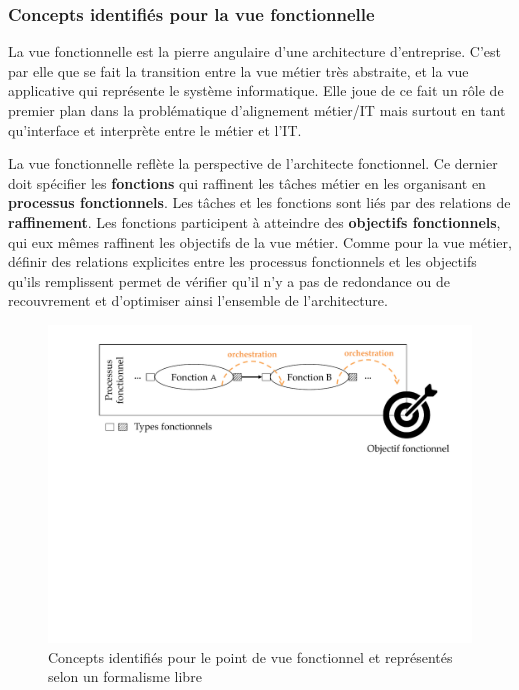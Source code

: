     \subsubsection{Concepts identifiés pour la vue fonctionnelle}

    La vue fonctionnelle est la pierre angulaire d'une architecture d'entreprise. C'est par elle que se fait la transition entre la vue métier très abstraite, et la vue applicative qui représente le système informatique.
    Elle joue de ce fait un rôle de premier plan dans la problématique d'alignement métier/IT mais surtout en tant
    qu'interface et interprète entre le métier et l'IT.

    La vue fonctionnelle reflète la perspective de l'architecte fonctionnel. Ce dernier doit spécifier les \textbf{fonctions}
    qui raffinent les tâches métier en les organisant en \textbf{processus fonctionnels}. Les tâches et les fonctions
    sont liés par des relations de \textbf{raffinement}.
    Les fonctions participent à atteindre des \textbf{objectifs fonctionnels}, qui eux mêmes raffinent les objectifs
    de la vue métier. Comme pour la vue métier, définir des relations explicites entre les processus fonctionnels
    et les objectifs qu'ils remplissent permet de vérifier qu'il n'y a pas de redondance ou de recouvrement
    et d'optimiser ainsi l'ensemble de l'architecture.

    \begin{figure}[!ht]
     \begin{center}
     \includegraphics[trim= 0cm 11cm 0cm 0cm, width=1\textwidth]{figures/4_demarche/concepts_vue_fonctionnelle.pdf} \end{center}
     \caption{Concepts identifiés pour le point de vue fonctionnel et représentés selon un formalisme libre}
     \label{fig:concepts_vue_fonctionnelle}
    \end{figure}

